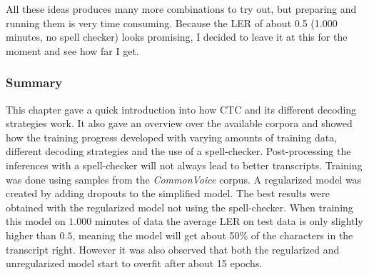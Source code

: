 All these ideas produces many more combinations to try out, but preparing and running them is very time consuming. Because the \ac{LER} of about 0.5 (1.000 minutes, no spell checker) looks promising, I decided to leave it at this for the moment and see how far I get.

\subsubsection{Summary}

This chapter gave a quick introduction into how \ac{CTC} and its different decoding strategies work. It also gave an overview over the available corpora and showed how the training progress developed with varying amounts of training data, different decoding strategies and the use of a spell-checker. Post-processing the inferences with a spell-checker will not always lead to better transcripts. Training was done using samples from the \textit{CommonVoice} corpus. A regularized model was created by adding dropouts to the simplified model. The best results were obtained with the regularized model not using the spell-checker. When training this model on $1.000$ minutes of data the average \ac{LER} on test data is only slightly higher than $0.5$, meaning the model will get about 50\% of the characters in the transcript right. However it was also observed that both the regularized and unregularized model start to overfit after about 15 epochs.